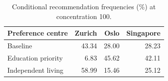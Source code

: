 \begin{table}[htbp]\centering
\caption{Conditional recommendation frequencies (\%) at concentration 100.}
\begin{tabular}{lrrr}\toprule
Preference centre & Zurich & Oslo & Singapore\\\midrule
Baseline & 43.34 & 28.00 & 28.23 \\
Education priority & 6.83 & 45.62 & 42.11 \\
Independent living & 58.99 & 15.46 & 25.12 \\
\bottomrule\end{tabular}\end{table}
